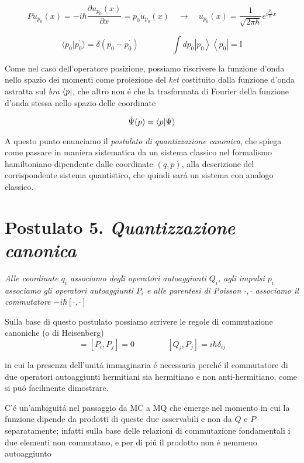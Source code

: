 \begin{enumerate}
$$P u_{p_{0}}(x)=-i\hbar{\frac{\partial u_{p_{0}}(x)}{\partial x}}=p_{0}u_{p_{0}}(x)\quad\longrightarrow\quad u_{p_{0}}(x)={\frac{1}{\sqrt{2\pi\hbar}}}e^{i{\frac{p_{0}}{\hbar}}x}$$

$$\langle p_{0}|p_{0}^{\prime}\rangle=\delta(p_{0}-p_{0}^{\prime}) \qquad\qquad \int d p_{0}\left|p_{0}\right\rangle\left\langle p_{0}\right|=\mathbb{I}$$

Come nel caso dell'operatore posizione, possiamo riscrivere la funzione d'onda nello spazio dei momenti come proiezione del \textit{ket} costituito dalla funzione d'onda astratta sul \textit{bra} $\normalsize\langle p \normalsize|$, che altro non \'e che la trasformata di Fourier della funzione d'onda stessa nello spazio delle coordinate 

$$\tilde{\Psi}(p) = \normalsize\langle p \normalsize| \Psi \normalsize\rangle$$

A questo punto enunciamo il \textit{postulato di quantizzazione canonica}, che spiega come passare in maniera sistematica da un sistema classico nel formalismo hamiltoniano dipendente dalle coordinate $(q, p)$, alla descrizione del corrispondente sistema quantistico, che quindi sar\'a un sistema con analogo classico. 

\chapter{\textbf{Postulato 5. \textit{Quantizzazione canonica}}} 

\textit{Alle coordinate $q_i$ associamo degli operatori autoaggiunti $Q_i$, agli impulsi $p_i$ associamo gli operatori autoaggiunti $P_i$ e alle parentesi di Poisson ${\cdot, \cdot}$ associamo il commutatore $-i\hbar[\cdot, \cdot]$}

Sulla base di questo postulato possiamo scrivere le regole di commutazione canoniche (o di Heisenberg)
\begin{equation}
	[Q_{i},Q_{j}]=[P_{i},P_{j}]=0\qquad\qquad[Q_{i},P_{j}]=i\hbar\delta_{i j}
\end{equation}

in cui la presenza dell'unit\'a immaginaria \'e necessaria perch\'e il commutatore di due operatori autoaggiunti hermitiani sia hermitiano e non anti-hermitiano, come si pu\'o facilmente dimostrare. 

C'\'e un'ambiguit\'a nel passaggio da MC a MQ che emerge nel momento in cui la funzione dipende da prodotti di queste due osservabili e non da $Q$ e $P$ separatamente; infatti sulla base delle relazioni di commutazione fondamentali i due elementi non commutano, e per di pi\'u il prodotto non \'e nemmeno autoaggiunto


\end{enumerate}
